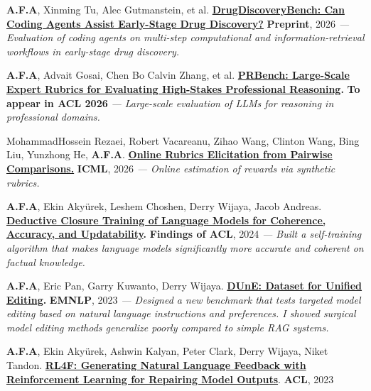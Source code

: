\begin{zitemize}
\setlength\itemsep{1em}
\item \textbf{A.F.A}, Xinming Tu, Alec Gutmanstein, et al. \textbf{\href{https://static.scale.com/uploads/6691558a94899f2f65a87a75/DrugDiscoveryBench.pdf}{DrugDiscoveryBench: Can Coding Agents Assist Early-Stage Drug Discovery?}} \textbf{Preprint}, 2026
\vspace{0.3em}
\newline
\textit{--- Evaluation of coding agents on multi-step computational and information-retrieval workflows in early-stage drug discovery.}
\item \textbf{A.F.A}, Advait Gosai, Chen Bo Calvin Zhang, et al. \textbf{\href{https://arxiv.org/abs/2511.11562}{PRBench: Large-Scale Expert Rubrics for Evaluating High-Stakes Professional Reasoning}.} \textbf{To appear in ACL 2026}
\vspace{0.3em}
\newline
\textit{--- Large-scale evaluation of LLMs for reasoning in professional domains.}
\item  MohammadHossein Rezaei, Robert Vacareanu, Zihao Wang, Clinton Wang, Bing Liu, Yunzhong He, \textbf{A.F.A}. \textbf{\href{https://arxiv.org/abs/2510.07284}{Online Rubrics Elicitation from Pairwise Comparisons.}} \textbf{ICML}, 2026
\vspace{0.3em}
\newline
\textit{--- Online estimation of rewards via synthetic rubrics.}
\item \textbf{A.F.A}, Ekin Akyürek, Leshem Choshen, Derry Wijaya, Jacob Andreas. \textbf{\href{https://arxiv.org/abs/2401.08574}{Deductive Closure Training of Language Models for Coherence, Accuracy, and Updatability}.} \textbf{Findings of ACL}, 2024
\vspace{0.3em}
\newline
\textit{--- Built a self-training algorithm that makes language models significantly more accurate and coherent on factual knowledge.}
\item \textbf{A.F.A}, Eric Pan, Garry Kuwanto, Derry Wijaya. \textbf{\href{https://arxiv.org/abs/2311.16087}{DUnE: Dataset for Unified Editing}.} \textbf{EMNLP}, 2023
\vspace{0.3em}
\newline \textit{--- Designed a new benchmark that tests targeted model editing based on natural language instructions and preferences. I showed surgical model editing methods generalize poorly compared to simple RAG systems.}
\newpage
\item \textbf{A.F.A}, Ekin Akyürek, Ashwin Kalyan, Peter Clark, Derry Wijaya, Niket Tandon. \textbf{\href{https://arxiv.org/abs/2305.08844}{RL4F: Generating Natural Language Feedback with Reinforcement Learning for Repairing Model Outputs}}. \textbf{ACL}, 2023

\end{zitemize}
